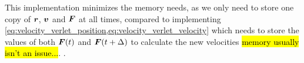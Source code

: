 This implementation minimizes the memory needs, as we only need to store one copy of $\boldsymbol{r}$, $\boldsymbol{v}$ and $\boldsymbol{F}$ at all times, compared to implementing \cref{eq:velocity_verlet_position,eq:velocity_verlet_velocity} which needs to store the values of both $\boldsymbol{F}(t)$ and $\boldsymbol{F}(t+\Delta)$ to calculate the new velocities \hl{memory usually isn't an issue...}. . 
